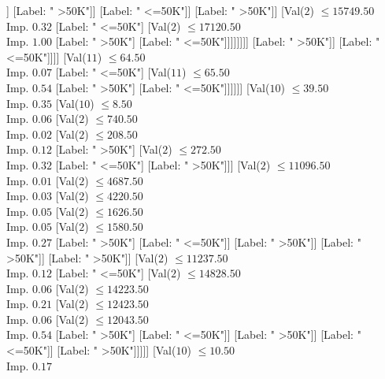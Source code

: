 \documentclass[margin=10pt]{standalone}
\begin{document}
\begin{forest}
																					[Label: " <=50K"]]
																				[Label: " >50K"]]
																			[Label: " <=50K"]]
																		[Label: " >50K"]]
																	[Val($2$) $ \leq 15749.50$ \\ Imp. $0.32$
																		[Label: " <=50K"]
																		[Val($2$) $ \leq 17120.50$ \\ Imp. $1.00$
																			[Label: " >50K"]
																			[Label: " <=50K"]]]]]]]]
												[Label: " >50K"]]
											[Label: " <=50K"]]]]
								[Val($11$) $ \leq 64.50$ \\ Imp. $0.07$
									[Label: " <=50K"]
									[Val($11$) $ \leq 65.50$ \\ Imp. $0.54$
										[Label: " >50K"]
										[Label: " <=50K"]]]]]]
					[Val($10$) $ \leq 39.50$ \\ Imp. $0.35$
						[Val($10$) $ \leq 8.50$ \\ Imp. $0.06$
							[Val($2$) $ \leq 740.50$ \\ Imp. $0.02$
								[Val($2$) $ \leq 208.50$ \\ Imp. $0.12$
									[Label: " >50K"]
									[Val($2$) $ \leq 272.50$ \\ Imp. $0.32$
										[Label: " <=50K"]
										[Label: " >50K"]]]
								[Val($2$) $ \leq 11096.50$ \\ Imp. $0.01$
									[Val($2$) $ \leq 4687.50$ \\ Imp. $0.03$
										[Val($2$) $ \leq 4220.50$ \\ Imp. $0.05$
											[Val($2$) $ \leq 1626.50$ \\ Imp. $0.05$
												[Val($2$) $ \leq 1580.50$ \\ Imp. $0.27$
													[Label: " >50K"]
													[Label: " <=50K"]]
												[Label: " >50K"]]
											[Label: " >50K"]]
										[Label: " >50K"]]
									[Val($2$) $ \leq 11237.50$ \\ Imp. $0.12$
										[Label: " <=50K"]
										[Val($2$) $ \leq 14828.50$ \\ Imp. $0.06$
											[Val($2$) $ \leq 14223.50$ \\ Imp. $0.21$
												[Val($2$) $ \leq 12423.50$ \\ Imp. $0.06$
													[Val($2$) $ \leq 12043.50$ \\ Imp. $0.54$
														[Label: " >50K"]
														[Label: " <=50K"]]
													[Label: " >50K"]]
												[Label: " <=50K"]]
											[Label: " >50K"]]]]]
							[Val($10$) $ \leq 10.50$ \\ Imp. $0.17$

\end{forest}
\end{document}
